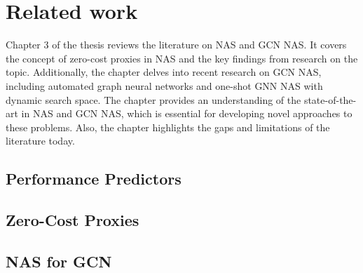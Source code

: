 \chapter{Related work}\label{chapter3}

Chapter 3 of the thesis reviews the literature on \gls{NAS} and \gls{GCN} \gls{NAS}. It covers the concept of zero-cost proxies in \gls{NAS} and the key findings from research on the topic. Additionally, the chapter delves into recent research on \gls{GCN} \gls{NAS}, including automated graph neural networks and one-shot \gls{GNN} \gls{NAS} with dynamic search space. The chapter provides an understanding of the state-of-the-art in \gls{NAS} and \gls{GCN} \gls{NAS}, which is essential for developing novel approaches to these problems. Also, the chapter highlights the gaps and limitations of the literature today.  

\section{Performance Predictors}\label{sec:rel_performance}

\section{Zero-Cost Proxies}



\begin{comment}

\end{comment}

\section{NAS for GCN}\label{sec:nas_gcn}



